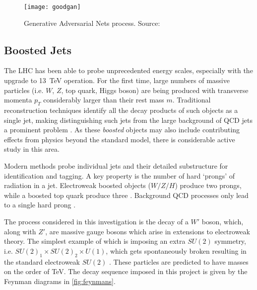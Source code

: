 \documentclass[twocolumn]{article}
\begin{document}
\begin{figure}[H]
	\centering
	\texttt{[image: goodgan]}
	
	\caption{Generative Adversarial Nets process. Source: \cite{GoodfellowNips}}
	\label{fig:gandiag}
	
\end{figure}
 

\subsection{Boosted Jets}

The LHC has been able to probe unprecedented energy scales, especially with the upgrade to \SI{13}{\tera\electronvolt} operation. For the first time, large numbers of massive particles (i.e. $W$, $Z$, top quark, Higgs boson) are being produced with transverse momenta $p_T$ considerably larger than their rest mass $m$. Traditional reconstruction techniques identify all the decay products of such objects as a single jet, making distinguishing such jets from the large background of QCD jets a prominent problem \cite{BOOST}. As these \textit{boosted} objects may also include contributing effects from physics beyond the standard model, there is considerable active study in this area.

Modern methods probe individual jets and their detailed substructure for identification and tagging. A key property is the number of hard `prongs' of radiation in a jet. Electroweak boosted objects ($W/Z/H$) produce two prongs, while a boosted top quark produce three \cite{nsubjettiness}. Background QCD processes only lead to a single hard prong \cite{prongs}.

The process considered in this investigation is the decay of a $W'$ boson, which, along with $Z'$, are massive gauge bosons which arise in extensions to electroweak theory. The simplest example of which is imposing an extra $SU(2)$ symmetry, i.e. $SU(2)_1 \times SU(2)_2 \times U(1)$, which gets spontaneously broken resulting in the standard electroweak $SU(2)$ \cite{pdg2012}. These particles are predicted to have masses on the order of \si{\tera\electronvolt}. The decay sequence imposed in this project is given by the Feynman diagrams in \cref{fig:feynmans}.
\end{document}
